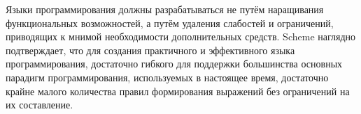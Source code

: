 
\label{historysection}

Языки программирования должны разрабатываться не путём наращивания функциональных возможностей,
а путём удаления слабостей и ограничений, приводящих к мнимой необходимости дополнительных
средств. Scheme наглядно подтверждает, что для создания практичного и эффективного языка
программирования, достаточно гибкого для поддержки большинства основных парадигм
программирования, используемых в настоящее время, достаточно крайне малого количества правил
формирования выражений без ограничений на их составление.

